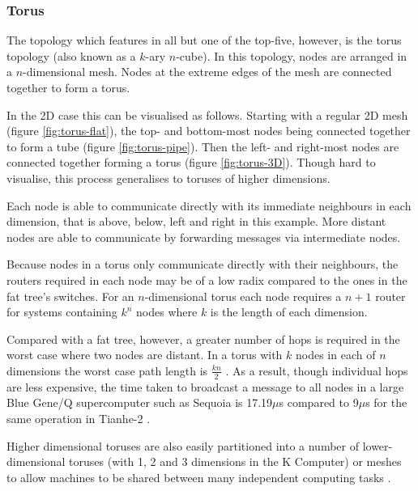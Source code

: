 			\subsubsection{Torus}
			
				The topology which features in all but one of the top-five, however, is
				the torus topology (also known as a $k$-ary $n$-cube). In this topology,
				nodes are arranged in a $n$-dimensional mesh. Nodes at the extreme edges
				of the mesh are connected together to form a torus.
				
				In the 2D case this can be visualised as follows. Starting with a
				regular 2D mesh (figure \ref{fig:torus-flat}), the top- and bottom-most
				nodes being connected together to form a tube (figure
				\ref{fig:torus-pipe}).  Then the left- and right-most nodes are
				connected together forming a torus (figure \ref{fig:torus-3D}). Though
				hard to visualise, this process generalises to toruses of higher
				dimensions.
				
				Each node is able to communicate directly with its immediate neighbours
				in each dimension, that is above, below, left and right in this example.
				More distant nodes are able to communicate by forwarding messages via
				intermediate nodes.
				
				Because nodes in a torus only communicate directly with their
				neighbours, the routers required in each node may be of a low radix
				compared to the ones in the fat tree's switches. For an $n$-dimensional
				torus each node requires a $n+1$ router for systems containing $k^n$
				nodes where $k$ is the length of each dimension.
				
				Compared with a fat tree, however, a greater number of hops is required
				in the worst case where two nodes are distant. In a torus with $k$ nodes
				in each of $n$ dimensions the worst case path length is $\frac{kn}{2}$
				\cite{dally04}. As a result, though individual hops are less expensive,
				the time taken to broadcast a message to all nodes in a large Blue Gene/Q
				supercomputer such as Sequoia is 17.19$\mu$s compared to 9$\mu$s for the
				same operation in Tianhe-2 \cite{morozov12}.
				
				Higher dimensional toruses are also easily partitioned into a number of
				lower-dimensional toruses (with 1, 2 and 3 dimensions in the K Computer)
				or meshes to allow machines to be shared between many independent
				computing tasks \cite{yokokawa11,chen11}.
				
